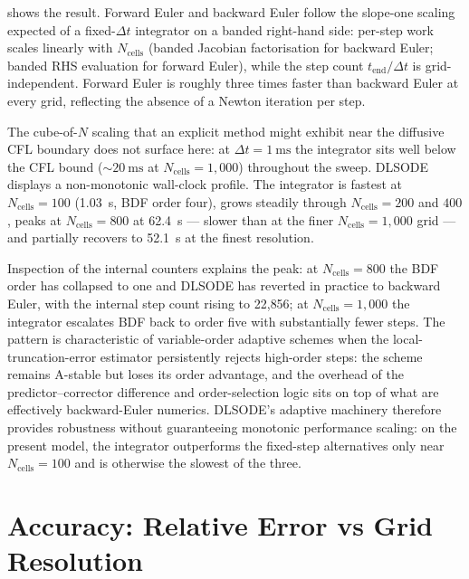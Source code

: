  shows the result. Forward Euler and backward Euler follow the slope-one scaling expected of a fixed-\(\Delta t\) integrator on a banded right-hand side: per-step work scales linearly with \(N_\mathrm{cells}\) (banded Jacobian factorisation for backward Euler; banded RHS evaluation for forward Euler), while the step count \(t_\mathrm{end}/\Delta t\) is grid-independent. Forward Euler is roughly three times faster than backward Euler at every grid, reflecting the absence of a Newton iteration per step. 

The cube-of-\(N\) scaling that an explicit method might exhibit near the diffusive CFL boundary does not surface here: at \(\Delta t = \SI{1}{\milli\second}\) the integrator sits well below the CFL bound (\(\sim\SI{20}{\milli\second}\) at \(N_\mathrm{cells} = 1{,}000\)) throughout the sweep. DLSODE displays a non-monotonic wall-clock profile. The integrator is fastest at \(N_\mathrm{cells} = 100\) (\SI{1.03}{\second}, BDF order four), grows steadily through \(N_\mathrm{cells} = 200\) and \(400\), peaks at \(N_\mathrm{cells} = 800\) at \SI{62.4}{\second} --- slower than at the finer \(N_\mathrm{cells} = 1{,}000\) grid --- and partially recovers to \SI{52.1}{\second} at the finest resolution. 

\newpage

Inspection of the internal counters explains the peak: at \(N_\mathrm{cells} = 800\) the BDF order has collapsed to one and DLSODE has reverted in practice to backward Euler, with the internal step count rising to 22{,}856; at \(N_\mathrm{cells} = 1{,}000\) the integrator escalates BDF back to order five with substantially fewer steps. The pattern is characteristic of variable-order adaptive schemes when the local-truncation-error estimator persistently rejects high-order steps: the scheme remains A-stable but loses its order advantage, and the overhead of the predictor--corrector difference and order-selection logic sits on top of what are effectively backward-Euler numerics. DLSODE's adaptive machinery therefore provides robustness without guaranteeing monotonic performance scaling: on the present model, the integrator outperforms the fixed-step alternatives only near \(N_\mathrm{cells} = 100\) and is otherwise the slowest of the three.

\section{Accuracy: Relative Error vs Grid Resolution}\label{sec:error_test}

